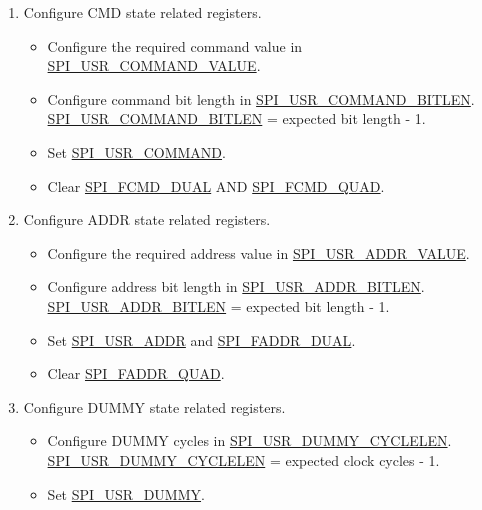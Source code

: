 \documentclass[main\_\_EN.tex]{subfiles}
\begin{document}
\begin{enumerate}
    \item Configure CMD state related registers.
        \begin{itemize}
            \item Configure the required command value in \hyperref[fielddesc:SPIUSRCOMMANDVALUE]{SPI\_USR\_COMMAND\_VALUE}.
            \item Configure command bit length in \hyperref[fielddesc:SPIUSRCOMMANDBITLEN]{SPI\_USR\_COMMAND\_BITLEN}. \hyperref[fielddesc:SPIUSRCOMMANDBITLEN]{SPI\_USR\_COMMAND\_BITLEN} = expected bit length - 1.
            \item Set \hyperref[fielddesc:SPIUSRCOMMAND]{SPI\_USR\_COMMAND}.
            \item Clear \hyperref[fielddesc:SPIFCMDDUAL]{SPI\_FCMD\_DUAL} AND \hyperref[fielddesc:SPIFCMDQUAD]{SPI\_FCMD\_QUAD}.
        \end{itemize}
        
    \item Configure ADDR state related registers.
        \begin{itemize}
            \item Configure the required address value in \hyperref[fielddesc:SPIUSRADDRVALUE]{SPI\_USR\_ADDR\_VALUE}.
            \item Configure address bit length in \hyperref[fielddesc:SPIUSRADDRBITLEN]{SPI\_USR\_ADDR\_BITLEN}. \hyperref[fielddesc:SPIUSRADDRBITLEN]{SPI\_USR\_ADDR\_BITLEN} = expected bit length - 1.
            \item Set \hyperref[fielddesc:SPIUSRADDR]{SPI\_USR\_ADDR} and \hyperref[fielddesc:SPIFADDRDUAL]{SPI\_FADDR\_DUAL}.
            \item Clear \hyperref[fielddesc:SPIFADDRQUAD]{SPI\_FADDR\_QUAD}.
        \end{itemize}
        
    \item Configure DUMMY state related registers.
        \begin{itemize}
            \item Configure DUMMY cycles in \hyperref[fielddesc:SPIUSRDUMMYCYCLELEN]{SPI\_USR\_DUMMY\_CYCLELEN}. \hyperref[fielddesc:SPIUSRDUMMYCYCLELEN]{SPI\_USR\_DUMMY\_CYCLELEN} = expected clock cycles - 1.
            \item Set \hyperref[fielddesc:SPIUSRDUMMY]{SPI\_USR\_DUMMY}.
        \end{itemize}        
        

\end{enumerate}
\end{document}

